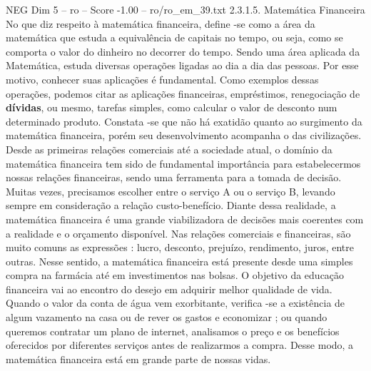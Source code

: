 \begin{textsample}{NEG Dim 5 – ro – Score -1.00 – ro/ro\_em\_39.txt}  \label{ex:f5_neg_174}
2.3.1.5.
Matemática Financeira No que diz respeito à matemática financeira, define -se como a área da matemática que estuda a equivalência de capitais no tempo, ou seja, como se comporta o valor do dinheiro no decorrer do tempo.
Sendo uma área aplicada da Matemática, estuda diversas operações ligadas ao dia a dia das pessoas.
Por esse motivo, conhecer suas aplicações é fundamental.
Como exemplos dessas operações, podemos citar as aplicações financeiras, empréstimos, renegociação de \textbf{dívidas}, ou mesmo, tarefas simples, como calcular o valor de desconto num determinado produto.
Constata -se que não há exatidão quanto ao surgimento da matemática financeira, porém seu desenvolvimento acompanha o das civilizações.
Desde as primeiras relações comerciais até a sociedade atual, o domínio da matemática financeira tem sido de fundamental importância para estabelecermos nossas relações financeiras, sendo uma ferramenta para a tomada de decisão.
Muitas vezes, precisamos escolher entre o serviço A ou o serviço B, levando sempre em consideração a relação custo-benefício.
Diante dessa realidade, a matemática financeira é uma grande viabilizadora de decisões mais coerentes com a realidade e o orçamento disponível.
Nas relações comerciais e financeiras, são muito comuns as expressões : lucro, desconto, prejuízo, rendimento, juros, entre outras.
Nesse sentido, a matemática financeira está presente desde uma simples compra na farmácia até em investimentos nas bolsas.
O objetivo da educação financeira vai ao encontro do desejo em adquirir melhor qualidade de vida.
Quando o valor da conta de água vem exorbitante, verifica -se a existência de algum vazamento na casa ou de rever os gastos e economizar ; ou quando queremos contratar um plano de internet, analisamos o preço e os benefícios oferecidos por diferentes serviços antes de realizarmos a compra.
Desse modo, a matemática financeira está em grande parte de nossas vidas.

\end{textsample}
